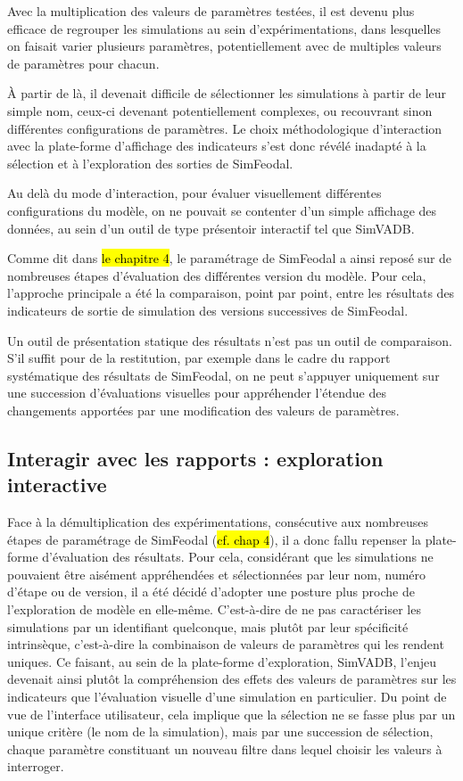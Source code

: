	Avec la multiplication des valeurs de paramètres testées, il est devenu plus efficace de regrouper les simulations au sein d'expérimentations, dans lesquelles on faisait varier plusieurs paramètres, potentiellement avec de multiples valeurs de paramètres pour chacun.

	À partir de là, il devenait difficile de sélectionner les simulations à partir de leur simple nom, ceux-ci devenant potentiellement complexes, ou recouvrant sinon différentes configurations de paramètres.
	Le choix méthodologique d'interaction avec la plate-forme d'affichage des indicateurs s'est donc révélé inadapté à la sélection et à l'exploration des sorties de SimFeodal.

	Au delà du mode d'interaction, pour évaluer visuellement différentes configurations du modèle, on ne pouvait se contenter d'un simple affichage des données, au sein d'un outil de type présentoir interactif tel que SimVADB.

	Comme dit dans \hl{le chapitre 4}, le paramétrage de SimFeodal a ainsi reposé sur de nombreuses étapes d'évaluation des différentes version du modèle.
	Pour cela, l'approche principale a été la comparaison, point par point, entre les résultats des indicateurs de sortie de simulation des versions successives de SimFeodal.

	Un outil de présentation statique des résultats n'est pas un outil de comparaison.
	S'il suffit pour de la restitution, par exemple dans le cadre du rapport systématique des résultats de SimFeodal, on ne peut s'appuyer uniquement sur une succession d'évaluations visuelles pour appréhender l'étendue des changements apportées par une modification des valeurs de paramètres.

	\subsection{Interagir avec les rapports : exploration interactive}\label{subsec:explo-interactive}

	Face à la démultiplication des expérimentations, consécutive aux nombreuses étapes de paramétrage de SimFeodal (\hl{cf. chap 4}), il a donc fallu repenser la plate-forme d'évaluation des résultats.
	Pour cela, considérant que les simulations ne pouvaient être aisément appréhendées et sélectionnées par leur nom, numéro d'étape ou de version, il a été décidé d'adopter une posture plus proche de l'exploration de modèle en elle-même.
	C'est-à-dire de ne pas caractériser les simulations par un identifiant quelconque, mais plutôt par leur spécificité intrinsèque, c'est-à-dire la combinaison de valeurs de paramètres qui les rendent uniques.
	Ce faisant, au sein de la plate-forme d'exploration, SimVADB, l'enjeu devenait ainsi plutôt la compréhension des effets des valeurs de paramètres sur les indicateurs que l'évaluation visuelle d'une simulation en particulier.
	Du point de vue de l'interface utilisateur, cela implique que la sélection ne se fasse plus par un unique critère (le nom de la simulation), mais par une succession de sélection, chaque paramètre constituant un nouveau filtre dans lequel choisir les valeurs à interroger.

